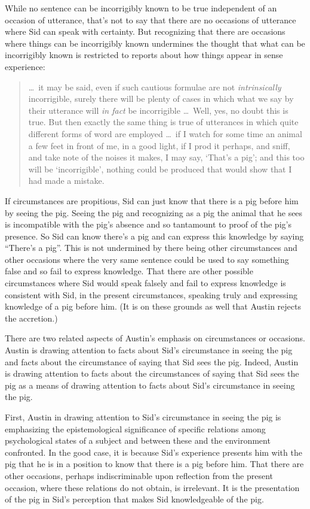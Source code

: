\documentclass[11pt]{article}
\begin{document}
While no sentence can be incorrigibly known to be true independent of an occasion of utterance, that's not to say that there are no occasions of utterance where Sid can speak with certainty. But recognizing that there are occasions where things can be incorrigibly known undermines the thought that what can be incorrigibly known is restricted to reports about how things appear in sense experience:
\begin{quote}
    \ldots\ it may be said, even if such cautious formulae are not \emph{intrinsically} incorrigible, surely there will be plenty of cases in which what we say by their utterance will \emph{in fact} be incorrigible \ldots\ Well, yes, no doubt this is true. But then exactly the same thing is true of utterances in which quite different forms of word are employed \ldots\ if I watch for some time an animal a few feet in front of me, in a good light, if I prod it perhaps, and sniff, and take note of the noises it makes, I may say, `That’s a pig’; and this too will be `incorrigible’, nothing could be produced that would show that I had made a mistake. \citep[114--5]{Austin:1962lr}
\end{quote}
If circumstances are propitious, Sid can just know that there is a pig before him by seeing the pig. Seeing the pig and recognizing as a pig the animal that he sees is incompatible with the pig's absence and so tantamount to proof of the pig's presence. So Sid can know there's a pig and can express this knowledge by saying ``There's a pig''. This is not undermined by there being other circumstances and other occasions where the very same sentence could be used to say something false and so fail to express knowledge. That there are other possible circumstances where Sid would speak falsely and fail to express knowledge is consistent with Sid, in the present circumstances, speaking truly and expressing knowledge of a pig before him. (It is on these grounds as well that Austin rejects the accretion.)

There are two related aspects of Austin's emphasis on circumstances or occasions. Austin is drawing attention to facts about Sid's circumstance in seeing the pig and facts about the circumstance of saying that Sid sees the pig. Indeed, Austin is drawing attention to facts about the circumstances of saying that Sid sees the pig as a means of drawing attention to facts about Sid's circumstance in seeing the pig.

First, Austin in drawing attention to Sid's circumstance in seeing the pig is emphasizing the epistemological significance of specific relations among psychological states of a subject and between these and the environment confronted. In the good case, it is because Sid's experience presents him with the pig that he is in a position to know that there is a pig before him. That there are other occasions, perhaps indiscriminable upon reflection from the present occasion, where these relations do not obtain, is irrelevant. It is the presentation of the pig in Sid's perception that makes Sid knowledgeable of the pig. 
\end{document}
